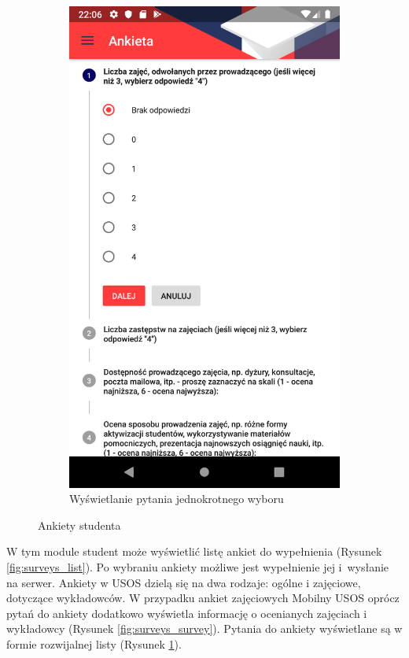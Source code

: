 \documentclass{pracamgr}
\begin{document}
\begin{figure}[p]
\begin{subfigure}[t]{0.3\textwidth}
		\includegraphics[width=\textwidth]{img/surveys_question.png}
		\caption{Wyświetlanie pytania jednokrotnego wyboru}
		\label{fig:surveys_question}
	\end{subfigure}
	\caption{Ankiety studenta}\label{fig:surveys}
	\medskip
\end{figure}

W tym module student może wyświetlić listę ankiet do wypełnienia (Rysunek \ref{fig:surveys_list}). Po wybraniu ankiety
możliwe jest wypełnienie jej i~wysłanie na serwer. Ankiety w USOS dzielą się na dwa
rodzaje: ogólne i zajęciowe, dotyczące wykładowców. W przypadku ankiet zajęciowych
Mobilny USOS oprócz pytań do ankiety dodatkowo wyświetla informację o ocenianych
zajęciach i wykładowcy (Rysunek \ref{fig:surveys_survey}). Pytania do ankiety
wyświetlane są w formie rozwijalnej listy (Rysunek \ref{fig:surveys_question}).
\end{document}

